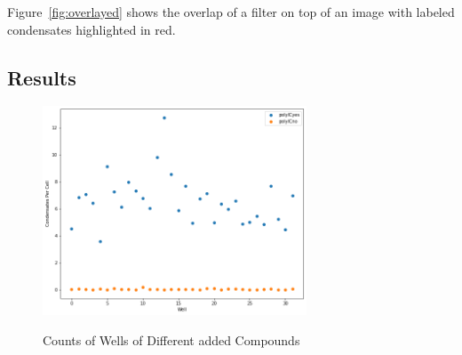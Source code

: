 \documentclass[11pt]{article}
\begin{document}
Figure~\ref{fig:overlayed} shows the overlap of a filter on top of an image
with labeled condensates highlighted in red.

\subsection{Results}
\begin{figure}[H]
    \centering
    {
        {
            {
                \includegraphics[width=0.7\textwidth]{well_results.png}
            }
        }
    }\caption{Counts of Wells of Different added Compounds}
    \label{fig:well_results}
\end{figure}
\end{document}
